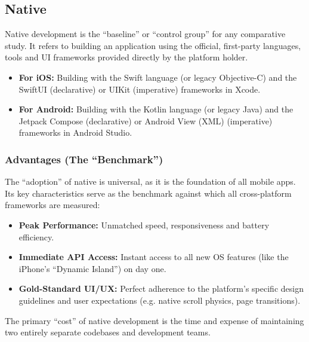     \subsection{Native}
        Native development is the ``baseline'' or ``control group'' for any comparative study. It refers to building an application using the official, first-party languages, tools and UI frameworks provided directly by the platform holder.
        
        \begin{itemize}
            \item \textbf{For iOS:} Building with the Swift language (or legacy Objective-C) and the SwiftUI (declarative) or UIKit (imperative) frameworks in Xcode.
            \item \textbf{For Android:} Building with the Kotlin language (or legacy Java) and the Jetpack Compose (declarative) or Android View (XML) (imperative) frameworks in Android Studio.
        \end{itemize}
        
        \subsubsection{Advantages (The ``Benchmark'')}
        The ``adoption'' of native is universal, as it is the foundation of all mobile apps. Its key characteristics serve as the benchmark against which all cross-platform frameworks are measured:
        \begin{itemize}
            \item \textbf{Peak Performance:} Unmatched speed, responsiveness and battery efficiency.
            \item \textbf{Immediate API Access:} Instant access to all new OS features (like the iPhone's ``Dynamic Island'') on day one.
            \item \textbf{Gold-Standard UI/UX:} Perfect adherence to the platform's specific design guidelines and user expectations (e.g. native scroll physics, page transitions).
        \end{itemize}
        The primary ``cost'' of native development is the time and expense of maintaining two entirely separate codebases and development teams.